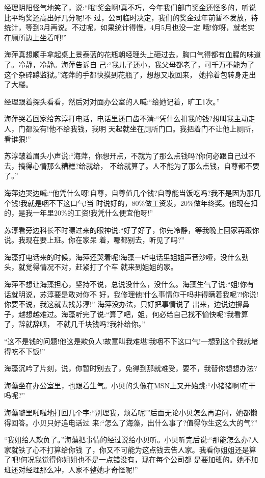 \documentclass[11pt,a4paper,onecolumn]{article}
\begin{document}
经理阴阳怪气地笑了，说:``哦!奖金啊!真不巧，今年我们部门奖金还怪多的，听说比平均奖还高出好几分呢!不
过，公司临时决定，我们的奖金过年前暂不发放，待统计，等到3月再说。不过呢，如果统计得慢，4月5月也没一定
哦!你呀，就老实在厕所边上坐着吧!''

海萍真想顺手拿起桌上景泰蓝的花瓶朝经理头上砸过去，胸口气得都有血腥的味道了。冷静，冷静。海萍告诉自
己:``我儿子还小，我父母都老了，可千万不能为了这个杂碎蹲监狱。''海萍的手都快摸到花瓶了，想想又收回来，
她拎着包转身走出了大楼。

经理跟着探头看看，然后对对面办公室的人喊:``给她记着，旷工1次。''

海萍哭着回家给苏淳打电话，电话里还口齿不清:``凭什么扣我的钱?想叫我主动走人，门都没有!他不给我钱，我明
天起就坐在厕所门口。我把着门不让他上厕所，看谁狠!''

苏淳皱着眉头小声说:``海萍，你想开点，不就为了那么点钱吗?你何必跟自己过不去，搞得心情那么糟糕?给就给，
不给就算了。人不能为了那么点钱，自尊都不要了。''

海萍边哭边喊:``他凭什么呀!自尊，自尊值几个钱?自尊能当饭吃吗?我不是因为那几个钱!我就是咽不下这口气!当
时说好的，80\%做工资发，20\%做年终奖。他现在扣的，是我一年里20\%的工资!我凭什么便宜他呀!''

苏淳看旁边科长不时瞟过来的眼神说:``好了好了，你先冷静，等我晚上回家再跟你说。我现在要上班。你在家呆
着，哪都别去，听见了吗?''

海藻打电话来的时候，海萍还哭着呢!海藻一听电话里姐姐声音沙哑，没什么劲头，就觉得情况不对，赶紧打了个车
就来到姐姐的家。

海萍不想让海藻担心，坚持不说，总说没什么，没什么。海藻生气了说:``姐!你有话就明说，苏淳要是敢对你不
好，我修理他!什么事情你干吗非得瞒着我呢?!你说!你要不说，我这就去找苏淳!'' 海萍没办法，只好把事情说了
出来，边说边擤鼻子，越想越难过。海藻听完了说:``算了吧，姐，何必给自己找不愉快呢?我看算了，辞就辞呗，
不就几千块钱吗?我补给你。''

``这不是钱的问题!他这是欺负人!故意叫我难堪!我咽不下这口气!一想到这个我就堵得吃不下饭!''

海藻沉吟了片刻，说，你暂时别去了，免得到那就难受，要不，我替你想想办法?

海藻坐在办公室里，也跟着生气。小贝的头像在MSN上又开始跳:``小猪猪啊!在干吗呢?''

海藻噼里啪啦地打回几个字:``别理我，烦着呢!''后面无论小贝怎么再追问，她都懒得回答。小贝只好追电话过
来:``怎么了海藻，出什么事了?值得你生这么大的气?''

``我姐给人欺负了。''海藻把事情的经过说给小贝听。小贝听完后说:``那能怎么办?人家就铁了心不打算给你钱
了，你又不可能为这点钱去告人家。我看你姐姐还是算了吧!何况我觉得你姐姐也不是一点错没有，现在每个公司都
是要加班的。她不加班还对经理那么冲，人家不整她才奇怪呢!''
\end{document}
